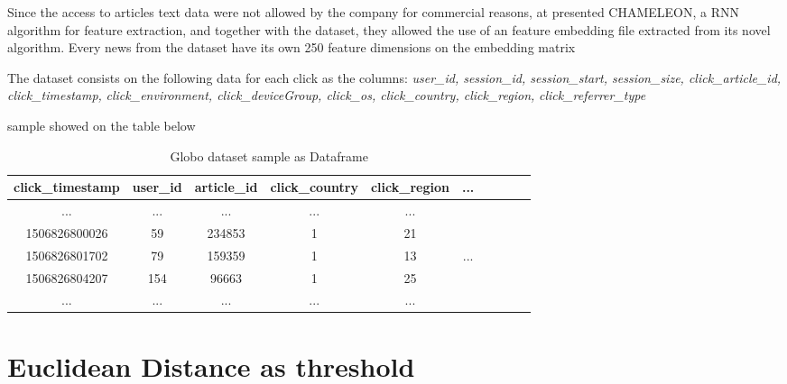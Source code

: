 \documentclass[ecp,tc,english]{iiufrgs}
\begin{document}
    Since the access to articles text data were not allowed by the company for commercial reasons, at \cite{deSouzaPereiraMoreira:2018:CDL:3240323.3240331} presented CHAMELEON, a RNN algorithm for feature extraction, and together with the dataset, they allowed the use of an feature embedding file extracted from its novel algorithm. Every news from the dataset have its own 250 feature dimensions on the embedding matrix
    
    The dataset consists on the following data for each click as the columns:
    \newline \textit{user\_id, session\_id, session\_start, session\_size, click\_article\_id, click\_timestamp,}
    \newline \textit{click\_environment, click\_deviceGroup, click\_os, click\_country, click\_region,}
    \newline \textit{click\_referrer\_type} 

    sample showed on the table below
    
    \begin{table}[!ht]
        \centering
        \begin{tabular}{ |c|c|c|c|c|c|c|c|c|c| } 
            \hline
            click\_timestamp & user\_id & article\_id & click\_country & click\_region & ... \\
            \hline 
            ... & ...  & ...  & ...  & ... & \\
            1506826800026 & 59 & 234853 & 1 & 21 & \\ 
            1506826801702 & 79 & 159359 & 1 & 13 & ...\\ 
            1506826804207 & 154 & 96663 & 1 & 25 & \\ 
            ... & ...  & ...  & ...  & ... & \\
            \hline
        \end{tabular}
        \caption{Globo dataset sample as Dataframe}
        \label{tab:globo_dataset_sample}
    \end{table}

    \section{Euclidean Distance as threshold}
\end{document}
